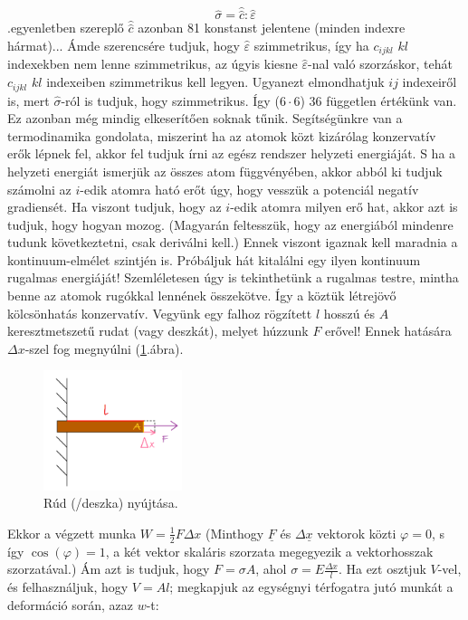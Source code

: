 \documentclass[a4paper, 12pt, titlepage]{article}
\begin{document}
\[\hat{\sigma}=\hat{\hat{c}}:\hat{\varepsilon}\]
.\hspace{1mm}egyenletben szereplő $\hat{\hat{c}}$ azonban 81 konstanst jelentene (minden indexre hármat)... Ámde szerencsére tudjuk, hogy $\hat{\varepsilon}$ szimmetrikus, így ha $c_{ijkl}$ $kl$ indexekben nem lenne szimmetrikus, az úgyis kiesne $\hat{\varepsilon}$-nal való szorzáskor, tehát $c_{ijkl}$ $kl$ indexeiben szimmetrikus kell legyen. Ugyanezt elmondhatjuk $ij$ indexeiről is, mert $\hat{\sigma}$-ról is tudjuk, hogy szimmetrikus. Így ($6\cdot 6$) 36 független értékünk van. Ez azonban még mindig elkeserítően soknak tűnik.
\newline
Segítségünkre van a termodinamika gondolata, miszerint ha az atomok közt kizárólag konzervatív erők lépnek fel, akkor fel tudjuk írni az egész rendszer helyzeti energiáját. S ha a helyzeti energiát ismerjük az összes atom függvényében, akkor abból ki tudjuk számolni az $i$-edik atomra ható erőt úgy, hogy vesszük a potenciál negatív gradiensét. Ha viszont tudjuk, hogy az $i$-edik atomra milyen erő hat, akkor azt is tudjuk, hogy hogyan mozog. (Magyarán feltesszük, hogy az energiából mindenre tudunk következtetni, csak deriválni kell.) Ennek viszont igaznak kell maradnia a kontinuum-elmélet szintjén is. Próbáljuk hát kitalálni egy ilyen kontinuum rugalmas energiáját! %
\newline
Szemléletesen úgy is tekinthetünk a rugalmas testre, mintha benne az atomok rugókkal lennének összekötve. Így a köztük létrejövő kölcsönhatás konzervatív.
Vegyünk egy falhoz rögzített $l$ hosszú és $A$ keresztmetszetű rudat (vagy deszkát), melyet húzzunk $F$ erővel! Ennek hatására $\Delta x$-szel fog megnyúlni (\ref{fig:rud}.\hspace{1mm}ábra). 
	\begin{figure}[!h]
	\includegraphics[height=3.5cm]{./rud.png} %
	\centering
	\caption{Rúd (/deszka) nyújtása.}
	\label{fig:rud}
	\end{figure}
Ekkor a végzett munka $W=\frac{1}{2}F\Delta x$ (Minthogy $\underline{F}$ és $\Delta\underline{x}$ vektorok közti $\varphi=0$, s így $\cos(\varphi)=1$, a két vektor skaláris szorzata megegyezik a vektorhosszak szorzatával.) Ám azt is tudjuk, hogy $F=\sigma A$, ahol $\sigma=E\frac{\Delta x}{l}$. Ha ezt osztjuk $V$-vel, és felhasználjuk, hogy $V=Al$; megkapjuk az egységnyi térfogatra jutó munkát a deformáció során, azaz $w$-t:
\end{document}
